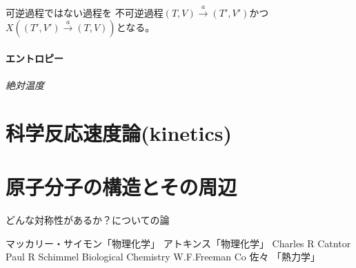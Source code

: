 \documentclass{ltjsarticle}
\begin{document}
可逆過程ではない過程を
不可逆過程\((T,V)\xrightarrow{a}(T',V')\)かつ\(X((T',V')\xrightarrow{a}(T,V))\)となる。

\subsection{エントロピー}
\paragraph{絶対温度}




\part{科学反応速度論(kinetics)}




\part{原子分子の構造とその周辺}
どんな対称性があるか？についての論


\begin{thebibliography}{9}
 マッカリー・サイモン「物理化学」
 アトキンス「物理化学」
 Charles R Catntor Paul R Schimmel Biological Chemistry W.F.Freeman Co 
 佐々 「熱力学」
\end{thebibliography}
\end{document}
